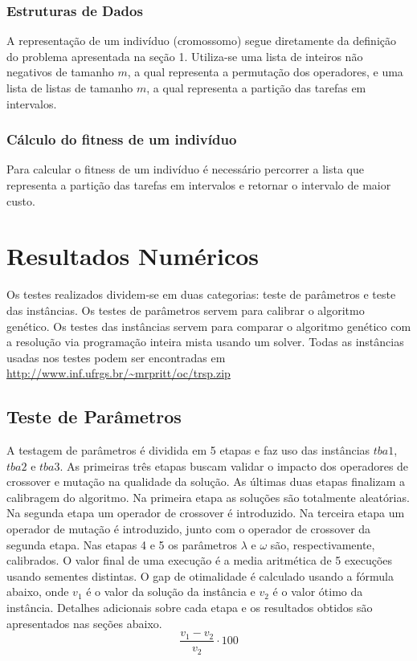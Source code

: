 \documentclass{article}
\begin{document}
\subsubsection{Estruturas de Dados}
A representação de um indivíduo (cromossomo) segue diretamente da definição do problema apresentada na seção 1.  Utiliza-se  uma lista de inteiros não negativos de tamanho $m$, a qual representa a permutação dos operadores, e uma lista de listas de tamanho $m$, a qual representa a partição das tarefas em intervalos.

\subsubsection{Cálculo do fitness de um indivíduo}
Para calcular o fitness de um indivíduo é necessário percorrer a lista  que representa a partição das tarefas em intervalos e retornar o intervalo de maior custo.

\section{Resultados Numéricos}
Os testes realizados dividem-se em duas categorias: teste de parâmetros e teste das instâncias. Os testes de parâmetros servem para calibrar o algoritmo genético. Os testes das instâncias servem para  comparar o algoritmo genético com a resolução via programação inteira mista usando um solver. Todas as instâncias usadas nos testes podem ser encontradas em \url{http://www.inf.ufrgs.br/~mrpritt/oc/trsp.zip}

\subsection{Teste de Parâmetros}
A testagem de parâmetros é dividida em 5 etapas e faz uso das instâncias $tba1$, $tba2$ e $tba3$. As primeiras três etapas  buscam validar o impacto dos operadores de crossover e mutação na qualidade da solução. As últimas duas etapas finalizam a calibragem do algoritmo. Na primeira etapa as soluções são totalmente aleatórias. Na segunda etapa um operador de crossover é introduzido. Na terceira etapa um operador de mutação é introduzido, junto com o operador de crossover da segunda etapa. Nas etapas 4 e 5 os parâmetros $\lambda$ e $\omega$ são, respectivamente, calibrados. O valor final de uma execução é a media aritmética de 5 execuções usando sementes distintas. O gap de otimalidade é calculado usando a fórmula abaixo, onde $v_{1}$ é o valor da solução da instância e $v_{2}$ é o valor ótimo da instância. Detalhes adicionais sobre cada etapa e os resultados obtidos são apresentados nas seções abaixo. 
$$ \frac{v_{1} - v_{2}}{v_{2}} \cdot 100$$
\end{document}
